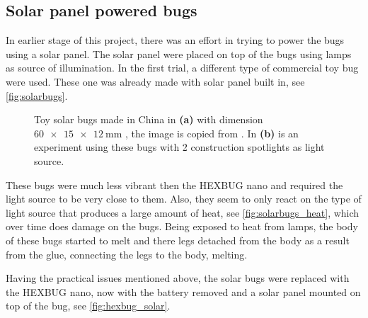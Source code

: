 \subsection{Solar panel powered bugs}

In earlier stage of this project, there was an effort in trying to power the bugs using a solar panel. 
The solar panel were placed on top of the bugs using lamps as source of illumination. In the first trial, 
a different type of commercial toy bug were used. These one was already made with solar panel built in, see \cref{fig:solarbugs}.


\begin{figure}[htpb!]
    \centering
    
    \caption{Toy solar bugs made in China in \textbf{(a)} with dimension $\SI[product-units = single]{60 x 15 x 12}{\milli\metre}$ 
    , the image is copied from \cite{www.alibaba.com}. In \textbf{(b)} is an experiment using these bugs with 2 construction 
    spotlights as light source.}
    \label{fig:solarbugs_experiment}
\end{figure}

These bugs were much less vibrant then the HEXBUG nano and required the light source to be very close 
to them. Also, they seem to only react on the type of light source that produces a large amount of heat, see \cref{fig:solarbugs_heat}, 
which over time does damage on the bugs. Being exposed to heat from lamps, the body of these bugs started to melt and there legs 
detached from the body as a result from the glue, connecting the legs to the body, melting. 

Having the practical issues mentioned above, the solar bugs were replaced with the HEXBUG nano, now with the battery removed and 
a solar panel mounted on top of the bug, see \cref{fig:hexbug_solar}.

